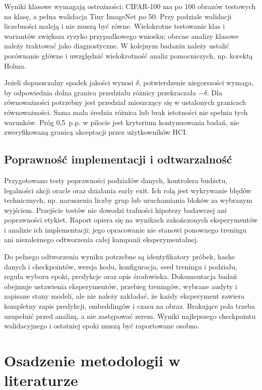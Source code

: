 \documentclass[12pt,a4paper]{article}
\newcommand{\pp}{p.p.}
\begin{document}
Wyniki klasowe wymagają ostrożności: CIFAR-100 ma po 100 obrazów testowych
na klasę, a pełna walidacja Tiny ImageNet po 50. Przy podziale walidacji
liczebności maleją i nie muszą być równe. Wielokrotne testowanie klas
i wariantów zwiększa ryzyko przypadkowego wniosku; obecne analizy klasowe
należy traktować jako diagnostyczne. W kolejnym badaniu należy ustalić
porównanie główne i uwzględnić wielokrotność analiz pomocniczych,
np. korektą Holma.

Jeżeli dopuszczalny spadek jakości wynosi $\delta$, potwierdzenie
niegorszości wymaga, by odpowiednia dolna granica przedziału różnicy
przekraczała $-\delta$. Dla równoważności potrzebny jest przedział
mieszczący się w ustalonych granicach równoważności. Sama mała średnia
różnica lub brak istotności nie spełnia tych warunków. Próg 0,5~\pp
w pilocie jest kryterium kontynuowania badań, nie zweryfikowaną granicą
akceptacji przez użytkowników HCI.

\subsection{Poprawność implementacji i odtwarzalność}

Przygotowano testy poprawności podziałów danych, kontrolera budżetu,
legalności akcji oracle oraz działania early exit. Ich rolą jest
wykrywanie błędów technicznych, np. naruszenia liczby grup lub uruchamiania
bloków za wybranym wyjściem. Przejście testów nie dowodzi trafności
hipotezy badawczej ani poprawności etykiet. Raport opiera się na wynikach
zakończonych eksperymentów i analizie ich implementacji;
jego opracowanie nie stanowi ponownego treningu
ani niezależnego odtworzenia całej kampanii eksperymentalnej.

Do pełnego odtworzenia wyniku potrzebne są identyfikatory próbek,
hashe danych i checkpointów, wersja kodu, konfiguracja, seed treningu
i podziału, reguła wyboru epoki, predykcje oraz opis środowiska.
Dokumentacja badań obejmuje ustawienia eksperymentów, przebieg treningów,
wybrane audyty i zapisane stany modeli,
ale nie należy zakładać, że każdy eksperyment zawiera kompletny zapis
predykcji, embeddingów i czasu na obraz. Brakujące pola trzeba uzupełnić
przed analizą, a nie zastępować zerem. Wyniki najlepszego checkpointu
walidacyjnego i ostatniej epoki muszą być raportowane osobno.

\section{Osadzenie metodologii w literaturze}
\end{document}
